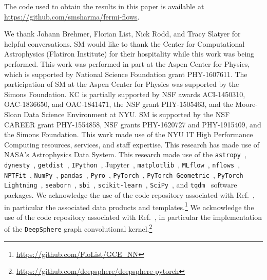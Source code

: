 \documentclass[prd,aps,10pt,nofootinbib,twocolumn,superscriptaddress,preprintnumbers,balancelastpage,longbibliography]{revtex4-1}
\begin{document}
The code used to obtain the results in this paper is available at \url{https://github.com/smsharma/fermi-flows}.


\vspace{.2cm}

\begin{acknowledgments}

We thank Johann Brehmer, Florian List, Nick Rodd, and Tracy Slatyer for helpful conversations. 
SM would like to thank the Center for Computational Astrophysics (Flatiron Institute) for their hospitality while this work was being performed. 
This work was performed in part at the Aspen Center for Physics, which is supported by National Science Foundation grant PHY-1607611.
The participation of SM at the Aspen Center for Physics was supported by the Simons Foundation.
KC is partially supported by NSF awards ACI-1450310, OAC-1836650, and OAC-1841471, the NSF grant PHY-1505463, and the Moore-Sloan Data Science Environment at NYU. 
SM is supported by the NSF CAREER grant PHY-1554858, NSF grants PHY-1620727 and PHY-1915409, and the Simons Foundation. 
This work made use of the NYU IT High Performance Computing resources, services, and staff expertise. 
This research has made use of NASA's Astrophysics Data System. 
This research made use of the \texttt{astropy}~\cite{Price-Whelan:2018hus,Robitaille:2013mpa}, \texttt{dynesty}~\cite{Speagle_2020}, \texttt{getdist}~\cite{Lewis:2019xzd}, \texttt{IPython}~\cite{PER-GRA:2007}, Jupyter~\cite{Kluyver2016JupyterN}, \texttt{matplotlib}~\cite{Hunter:2007}, \texttt{MLflow}~\cite{chen2020developments}, \texttt{nflows}~\cite{nflows}, \texttt{NPTFit}~\cite{Mishra-Sharma:2016gis}, \texttt{NumPy}~\cite{harris2020array}, \texttt{pandas}~\cite{pandas:2010}, \texttt{Pyro}~\cite{bingham2018pyro}, \texttt{PyTorch}~\cite{NEURIPS2019_9015}, \texttt{PyTorch Geometric}~\cite{Fey/Lenssen/2019}, \texttt{PyTorch Lightning}~\cite{william_falcon_2020_3828935}, \texttt{seaborn}~\cite{seaborn}, \texttt{sbi}~\cite{tejero-cantero2020sbi}, \texttt{scikit-learn}~\cite{scikit-learn}, \texttt{SciPy}~\cite{2020SciPy-NMeth}, and \texttt{tqdm}~\cite{da2019tqdm} software packages. We acknowledge the use of the code repository associated with Ref.~\cite{List:2020mzd}, in particular the associated data products and templates.\footnote{\url{https://github.com/FloList/GCE_NN}} We acknowledge the use of the code repository associated with Ref.~\cite{defferrard2020deepsphere}, in particular the implementation of the \texttt{DeepSphere} graph convolutional kernel.\footnote{\url{https://github.com/deepsphere/deepsphere-pytorch}}
\end{acknowledgments}





\end{document}
